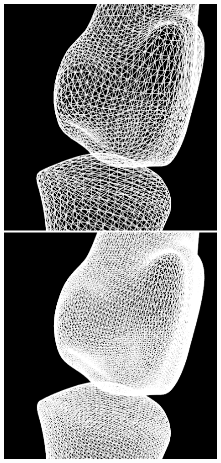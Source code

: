 \documentclass[10pt, conference, compsocconf]{IEEEtran}
\begin{document}
\begin{figure}[htbp]
{\begin{minipage}[h]{0.16\linewidth}
        \includegraphics[width=\textwidth]{./Figure/footbones/fingerBones/loop2-.png}\\
        \includegraphics[width=\textwidth]{./Figure/footbones/fingerBones/loop3-.png}\vspace{1ex}\\

\end{minipage}}
\end{figure}
\end{document}
